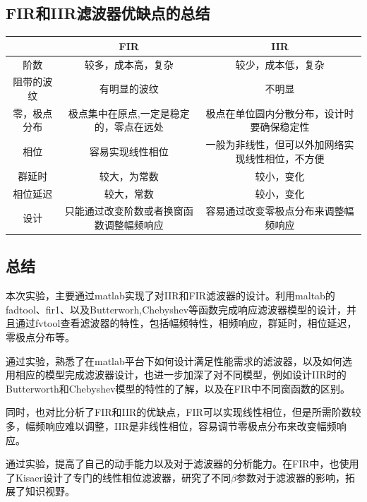 \documentclass[UTF8]{ctexart}
\begin{document}
\subsection{FIR和IIR滤波器优缺点的总结}
\begin{table}[H]
	\centering
	\begin{tabular}{|c|c|c|}
		\hline
		& FIR & IIR \\ \hline
		阶数 & 较多，成本高，复杂 & 较少，成本低，复杂 \\ \hline
		阻带的波纹 & 有明显的波纹 & 不明显 \\ \hline
		零，极点分布 & 极点集中在原点,一定是稳定的，零点在远处 & 极点在单位圆内分散分布，设计时要确保稳定性 \\ \hline
		相位 & 容易实现线性相位 & 一般为非线性，但可以外加网络实现线性相位，不方便 \\ \hline
		群延时 & 较大，为常数 & 较小，变化 \\ \hline
		相位延迟 & 较大，常数 & 较小，变化 \\ \hline
		设计 & 只能通过改变阶数或者换窗函数调整幅频响应 & 容易通过改变零极点分布来调整幅频响应 \\ \hline
	\end{tabular}
\end{table}
\subsection{总结}
\hspace*{2em}本次实验，主要通过matlab实现了对IIR和FIR滤波器的设计。利用maltab的fadtool、fir1、以及Butterworh,Chebyshev等函数完成响应滤波器模型的设计，并且通过fvtool查看滤波器的特性，包括幅频特性，相频响应，群延时，相位延迟，零极点分布等。

通过实验，熟悉了在matlab平台下如何设计满足性能需求的滤波器，以及如何选用相应的模型完成滤波器设计，也进一步加深了对不同模型，例如设计IIR时的Butterworth和Chebyshev模型的特性的了解，以及在FIR中不同窗函数的区别。

同时，也对比分析了FIR和IIR的优缺点，FIR可以实现线性相位，但是所需阶数较多，幅频响应难以调整，IIR是非线性相位，容易调节零极点分布来改变幅频响应。

通过实验，提高了自己的动手能力以及对于滤波器的分析能力。在FIR中，也使用了Kisaer设计了专门的线性相位滤波器，研究了不同$\beta$参数对于滤波器的影响，拓展了知识视野。
\end{document}
